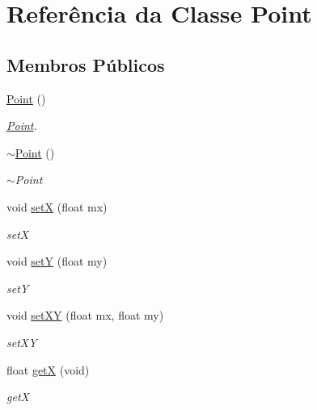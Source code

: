 \hypertarget{class_point}{}\section{Referência da Classe Point}
\label{class_point}
\subsection*{Membros Públicos}
\begin{DoxyCompactItemize}
\item 
\mbox{\label{class_point_ad92f2337b839a94ce97dcdb439b4325a}} 
\mbox{\hyperlink{class_point_ad92f2337b839a94ce97dcdb439b4325a}{Point}} ()
\begin{DoxyCompactList}\small\item\em \mbox{\hyperlink{class_point}{Point}}. \end{DoxyCompactList}\item 
\mbox{\label{class_point_a395fa04b4ec126b66fc053f829a30cc1}} 
\mbox{\hyperlink{class_point_a395fa04b4ec126b66fc053f829a30cc1}{$\sim$\+Point}} ()
\begin{DoxyCompactList}\small\item\em $\sim$\+Point \end{DoxyCompactList}\item 
void \mbox{\hyperlink{class_point_acee4acaa1d515e9973145f977e500fe6}{setX}} (float mx)
\begin{DoxyCompactList}\small\item\em setX \end{DoxyCompactList}\item 
void \mbox{\hyperlink{class_point_a756b3f64d961a5059302f42e1fcf2332}{setY}} (float my)
\begin{DoxyCompactList}\small\item\em setY \end{DoxyCompactList}\item 
void \mbox{\hyperlink{class_point_afe2b937778d9fe5c135ab61de91271e9}{set\+XY}} (float mx, float my)
\begin{DoxyCompactList}\small\item\em set\+XY \end{DoxyCompactList}\item 
float \mbox{\hyperlink{class_point_a9aa94b8fd07296e64d304ef3750db113}{getX}} (void)
\begin{DoxyCompactList}\small\item\em getX \end{DoxyCompactList}\item 

\end{DoxyCompactItemize}
